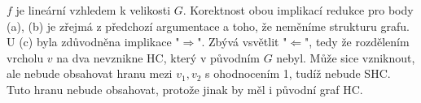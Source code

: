 \documentclass[a4wide,10pt]{extarticle}
\begin{document}
\begin{enumerate}
\begin{enumerate}
		\end{enumerate}
		$f$ je lineární vzhledem k velikosti $G$. Korektnost obou implikací redukce pro body (a), (b) je zřejmá z předchozí argumentace a toho, že neměníme strukturu grafu. U (c) byla zdůvodněna implikace "$\Rightarrow$". Zbývá vsvětlit "$\Leftarrow$", tedy že rozdělením vrcholu $v$ na dva nevznikne HC, který v původním $G$ nebyl. Může sice vzniknout, ale nebude obsahovat hranu mezi $v_1, v_2$ s ohodnocením 1, tudíž nebude SHC. Tuto hranu nebude obsahovat, protože jinak by měl i původní graf HC.
\end{enumerate}
\end{document}
